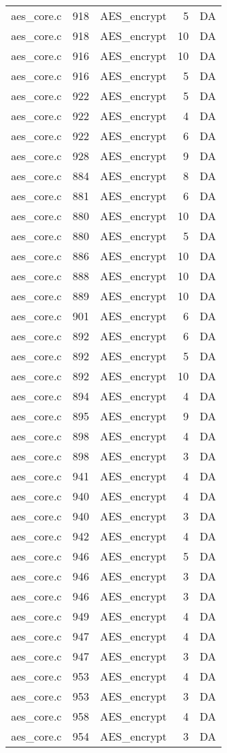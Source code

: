 \begin{table}
\begin{tabular}{lrlrr}
aes\_core.c& 918&AES\_encrypt&5 &DA\\
aes\_core.c& 918&AES\_encrypt&10&DA\\
aes\_core.c& 916&AES\_encrypt&10&DA\\
aes\_core.c& 916&AES\_encrypt&5 &DA\\
aes\_core.c& 922&AES\_encrypt&5 &DA\\
aes\_core.c& 922&AES\_encrypt&4 &DA\\
aes\_core.c& 922&AES\_encrypt&6 &DA\\
aes\_core.c& 928&AES\_encrypt&9 &DA\\
aes\_core.c& 884&AES\_encrypt&8 &DA\\
aes\_core.c& 881&AES\_encrypt&6 &DA\\
aes\_core.c& 880&AES\_encrypt&10&DA\\
aes\_core.c& 880&AES\_encrypt&5 &DA\\
aes\_core.c& 886&AES\_encrypt&10&DA\\
aes\_core.c& 888&AES\_encrypt&10&DA\\
aes\_core.c& 889&AES\_encrypt&10&DA\\
aes\_core.c& 901&AES\_encrypt&6 &DA\\
aes\_core.c& 892&AES\_encrypt&6 &DA\\
aes\_core.c& 892&AES\_encrypt&5 &DA\\
aes\_core.c& 892&AES\_encrypt&10&DA\\
aes\_core.c& 894&AES\_encrypt&4 &DA\\
aes\_core.c& 895&AES\_encrypt&9 &DA\\
aes\_core.c& 898&AES\_encrypt&4 &DA\\
aes\_core.c& 898&AES\_encrypt&3 &DA\\
aes\_core.c& 941&AES\_encrypt&4 &DA\\
aes\_core.c& 940&AES\_encrypt&4 &DA\\
aes\_core.c& 940&AES\_encrypt&3 &DA\\
aes\_core.c& 942&AES\_encrypt&4 &DA\\
aes\_core.c& 946&AES\_encrypt&5 &DA\\
aes\_core.c& 946&AES\_encrypt&3 &DA\\
aes\_core.c& 946&AES\_encrypt&3 &DA\\
aes\_core.c& 949&AES\_encrypt&4 &DA\\
aes\_core.c& 947&AES\_encrypt&4 &DA\\
aes\_core.c& 947&AES\_encrypt&3 &DA\\
aes\_core.c& 953&AES\_encrypt&4 &DA\\
aes\_core.c& 953&AES\_encrypt&3 &DA\\
aes\_core.c& 958&AES\_encrypt&4 &DA\\
aes\_core.c& 954&AES\_encrypt&3 &DA\\
\hline
\end{tabular}
\end{table}